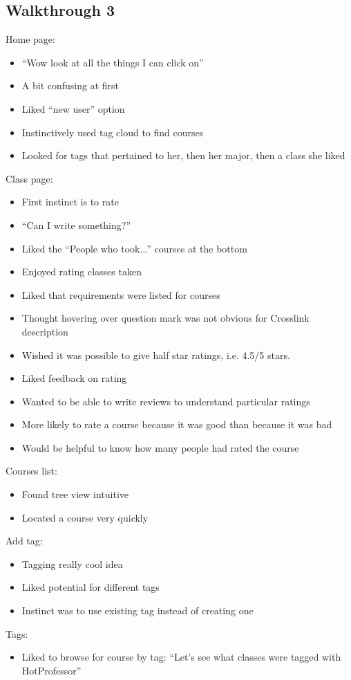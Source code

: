 \documentclass[12pt]{report}
\begin{document}
\subsection{Walkthrough 3}
Home page:
\begin{itemize}
\item ``Wow look at all the things I can click on''
\item A bit confusing at first
\item Liked ``new user'' option
\item Instinctively used tag cloud to find courses
\item Looked for tags that pertained to her, then her major, then a class she liked
\end{itemize}
Class page:
\begin{itemize}
\item First instinct is to rate
\item ``Can I write something?''
\item Liked the ``People who took...'' courses at the bottom
\item Enjoyed rating classes taken
\item Liked that requirements were listed for courses
\item Thought hovering over question mark was not obvious for Crosslink description
\item Wished it was possible to give half star ratings, i.e. 4.5/5 stars.
\item Liked feedback on rating
\item Wanted to be able to write reviews to understand particular ratings
\item More likely to rate a course because it was good than because it was bad
\item Would be helpful to know how many people had rated the course
\end{itemize}
Courses list:
\begin{itemize}
\item Found tree view intuitive
\item Located a course very quickly
\end{itemize}
Add tag:
\begin{itemize}
\item Tagging really cool idea
\item Liked potential for different tags
\item Instinct was to use existing tag instead of creating one
\end{itemize}
Tags:
\begin{itemize}
\item Liked to browse for course by tag: ``Let's see what classes were tagged with HotProfessor''
\end{itemize}
\end{document}
